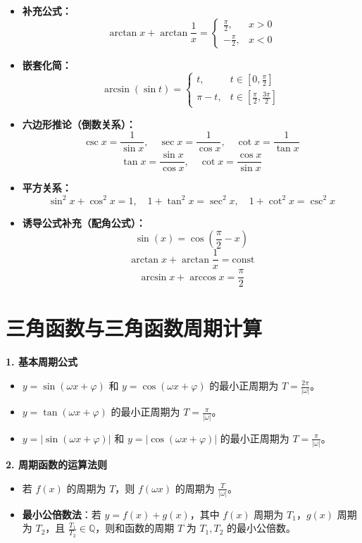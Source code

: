 \documentclass[a4paper,12pt]{ctexart}
\begin{document}
\begin{itemize}
    \item \textbf{补充公式：}
    \[ \arctan x + \arctan \frac{1}{x} = \begin{cases} \frac{\pi}{2}, & x > 0 \\ -\frac{\pi}{2}, & x < 0 \end{cases} \]
    
    \item \textbf{嵌套化简：}
    \[ \arcsin(\sin t) = \begin{cases} t, & t \in [0, \frac{\pi}{2}] \\ \pi - t, & t \in [\frac{\pi}{2}, \frac{3\pi}{2}] \end{cases} \]
    
    \item \textbf{六边形推论（倒数关系）：}
    \[ \csc x = \frac{1}{\sin x}, \quad \sec x = \frac{1}{\cos x}, \quad \cot x = \frac{1}{\tan x} \]
    \[ \tan x = \frac{\sin x}{\cos x}, \quad \cot x = \frac{\cos x}{\sin x} \]
    
    \item \textbf{平方关系：}
    \[ \sin^2 x + \cos^2 x = 1, \quad 1 + \tan^2 x = \sec^2 x, \quad 1 + \cot^2 x = \csc^2 x \]
    
    \item \textbf{诱导公式补充（配角公式）：}
    \[ \sin(x) = \cos(\frac{\pi}{2} - x) \]
    \[ \arctan x + \arctan \frac{1}{x} = \text{const} \]
    \[ \arcsin x + \arccos x = \frac{\pi}{2} \]
\end{itemize}

\section*{三角函数与三角函数周期计算}
\noindent \textbf{1. 基本周期公式}
\begin{itemize}
    \item $y = \sin(\omega x + \varphi)$ 和 $y = \cos(\omega x + \varphi)$ 的最小正周期为 $T = \frac{2\pi}{|\omega|}$。
    \item $y = \tan(\omega x + \varphi)$ 的最小正周期为 $T = \frac{\pi}{|\omega|}$。
    \item $y = |\sin(\omega x + \varphi)|$ 和 $y = |\cos(\omega x + \varphi)|$ 的最小正周期为 $T = \frac{\pi}{|\omega|}$。
\end{itemize}

\vspace{0.3cm}
\noindent \textbf{2. 周期函数的运算法则}
\begin{itemize}
    \item 若 $f(x)$ 的周期为 $T$，则 $f(\omega x)$ 的周期为 $\frac{T}{|\omega|}$。
    \item \textbf{最小公倍数法}：若 $y = f(x) + g(x)$，其中 $f(x)$ 周期为 $T_1$，$g(x)$ 周期为 $T_2$，且 $\frac{T_1}{T_2} \in \mathbb{Q}$，则和函数的周期 $T$ 为 $T_1, T_2$ 的最小公倍数。
\end{itemize}
\end{document}
